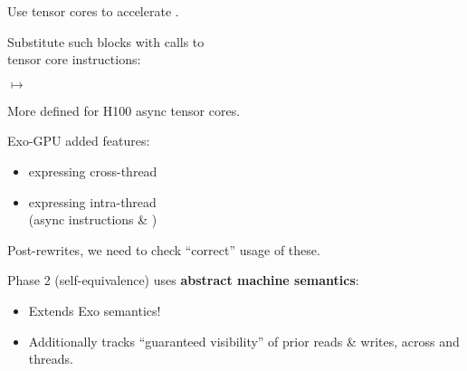 {\LARGE
Use tensor cores to accelerate .

}

\newpage
{}

{\LARGE
Substitute such blocks with calls to\\
 tensor core instructions:

}

{\LARGE

}

\vspace{8mm}

{\LARGE
$\mapsto$ 
}

\vspace{8mm}

{\LARGE
More  defined for H100 async tensor cores.

}


\newpage
{}

{\LARGE
Exo-GPU added features:
\begin{itemize}
  \item expressing cross-thread 
  \item expressing intra-thread \\(async instructions \& )
\end{itemize}

\vspace{6mm}
Post-rewrites, we need to check ``correct'' usage of these.

}


\newpage
{}

{\LARGE
Phase 2 (self-equivalence) uses \textbf{abstract machine semantics}:
\begin{itemize}
  \item Extends  Exo semantics!
  \item Additionally tracks ``guaranteed visibility'' of prior reads \& writes, across  and threads.
\end{itemize}

}

\begin{center}
{\large
{}
}
\end{center}


